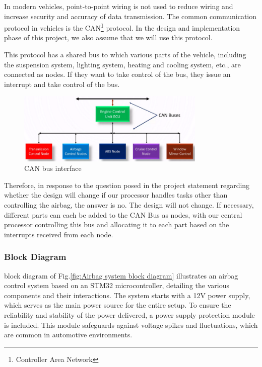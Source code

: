 \documentclass[12pt	]{article}
\begin{document}
In modern vehicles, point-to-point wiring is not used to reduce wiring and increase security and accuracy of data transmission. The common communication protocol in vehicles is the CAN\footnote{Controller Area Network} protocol. In the design and implementation phase of this project, we also assume that we will use this protocol.

This protocol has a shared bus to which various parts of the vehicle, including the suspension system, lighting system, heating and cooling system, etc., are connected as nodes. If they want to take control of the bus, they issue an interrupt and take control of the bus.

\begin{figure}[h]
	\centering
	\includegraphics[width=0.8\textwidth]{Images/img8.png}
	\caption{CAN bus interface}
	\label{fig:CAN bus interface}
\end{figure}

Therefore, in response to the question posed in the project statement regarding whether the design will change if our processor handles tasks other than controlling the airbag, the answer is no. The design will not change. If necessary, different parts can each be added to the CAN Bus as nodes, with our central processor controlling this bus and allocating it to each part based on the interrupts received from each node.


\subsubsection{Block Diagram}
block diagram of Fig.\ref{fig:Airbag system block diagram} illustrates an airbag control system based on an STM32 microcontroller, detailing the various components and their interactions. The system starts with a 12V power supply, which serves as the main power source for the entire setup. To ensure the reliability and stability of the power delivered, a power supply protection module is included. This module safeguards against voltage spikes and fluctuations, which are common in automotive environments.
\end{document}
